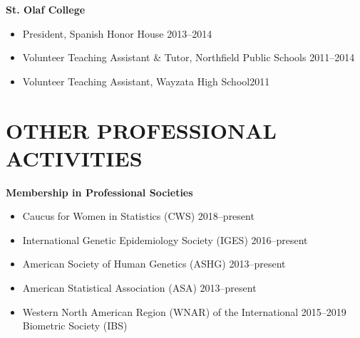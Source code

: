 \documentclass[margin]{res}
\begin{document}
\begin{resume}
\textbf{St. Olaf College}
\begin{itemize}
			\item President, Spanish Honor House \hfill 2013--2014
			\item Volunteer Teaching Assistant \& Tutor, Northfield Public Schools \hfill 2011--2014
			\item Volunteer Teaching Assistant, Wayzata High School\hfill 2011 \\
\end{itemize}

\section{OTHER PROFESSIONAL \\ ACTIVITIES}  	

\hspace{0.1cm}\textbf{Membership in Professional Societies}
\begin{itemize}	 %
\item Caucus for Women in Statistics (CWS) \hfill 2018--present
\item International Genetic Epidemiology Society (IGES) \hfill 2016--present
\item American Society of Human Genetics (ASHG) \hfill 2013--present
\item American Statistical Association (ASA) \hfill 2013--present
\item Western North American Region (WNAR) of the International \hfill 2015--2019 \\  Biometric Society (IBS)  %
\end{itemize}
	

\end{resume}
\end{document}
